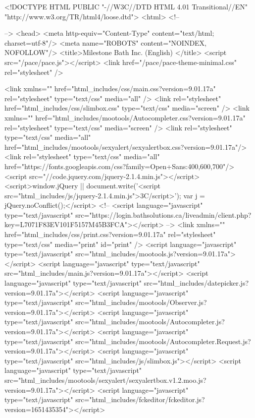 <!DOCTYPE HTML PUBLIC "-//W3C//DTD HTML 4.01 Transitional//EN" "http://www.w3.org/TR/html4/loose.dtd">
<html>
<!--

 -->
<head>
	<meta http-equiv="Content-Type" content="text/html; charset=utf-8"/>
    <meta name="ROBOTS" content="NOINDEX, NOFOLLOW"/>
    <title>Milestone Bath Inc. (English) </title>
    <script src="/pace/pace.js"></script>
    <link href="/pace/pace-theme-minimal.css" rel="stylesheet" />

        <link xmlns="" href="html_includes/css/main.css?version=9.01.17a" rel="stylesheet" type="text/css" media="all" />
	    <link rel="stylesheet" href="html_includes/css/slimbox.css" type="text/css" media="screen" />
    <link xmlns="" href="html_includes/mootools/Autocompleter.css?version=9.01.17a" rel="stylesheet" type="text/css" media="screen" />
	<link rel="stylesheet" type="text/css" media="all" href="html_includes/mootools/sexyalert/sexyalertbox.css?version=9.01.17a"/>
    <link rel="stylesheet" type="text/css" media="all" href="https://fonts.googleapis.com/css?family=Open+Sans:400,600,700"/>
    <script src="//code.jquery.com/jquery-2.1.4.min.js"></script>
    <script>window.jQuery || document.write('<script src="html_includes/js/jquery-2.1.4.min.js">\x3C/script>'); var j = jQuery.noConflict();</script>
    <!-- <script language="javascript" type="text/javascript" src="https://login.bathsolutions.ca/liveadmin/client.php?key=L7071F83EV101F5157M45B3FCA"></script> -->
	<link xmlns="" href="html_includes/css/print.css?version=9.01.17a" rel="stylesheet" type="text/css" media="print" id="print" />
	<script language="javascript" type="text/javascript" src="html_includes/mootools.js?version=9.01.17a"></script>
	<script language="javascript" type="text/javascript" src="html_includes/main.js?version=9.01.17a"></script>
	<script language="javascript" type="text/javascript" src="html_includes/datepicker.js?version=9.01.17a"></script>
	<script language="javascript" type="text/javascript" src="html_includes/mootools/Observer.js?version=9.01.17a"></script>
	<script language="javascript" type="text/javascript" src="html_includes/mootools/Autocompleter.js?version=9.01.17a"></script>
	<script language="javascript" type="text/javascript" src="html_includes/mootools/Autocompleter.Request.js?version=9.01.17a"></script>
    <script language="javascript" type="text/javascript" src="html_includes/js/slimbox.js"></script>
    <script language="javascript" type="text/javascript" src="html_includes/mootools/sexyalert/sexyalertbox.v1.2.moo.js?version=9.01.17a"></script>
	<script language="javascript" type="text/javascript" src="html_includes/fckeditor/fckeditor.js?version=1651435354"></script>

